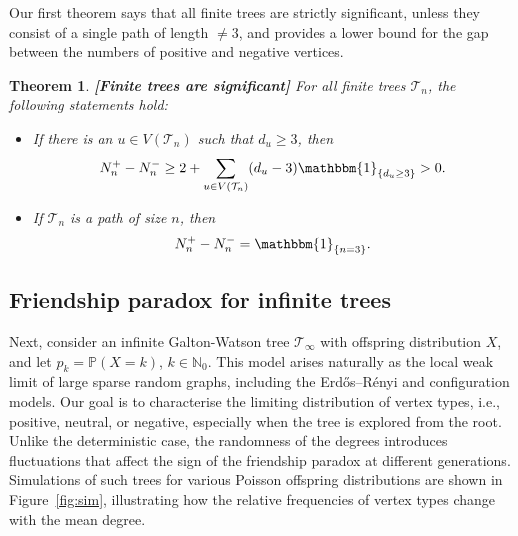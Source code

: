 \documentclass[11pt]{article}
\numberwithin{equation}{section}
\theoremstyle{plain}
\newtheorem{theorem}{Theorem}[section]
\newcommand{\N}{\mathbb N}
\newcommand{\PP}{\mathbb{P}}
\newcommand{\Tt}{\mathcal{T}}
\newcommand{\ind}[1]{\mathbbm{1}_{\left\{#1\right\}}}
\begin{document}
Our first theorem says that all finite trees are strictly significant, unless they consist of a single path of length $\neq 3$, and provides a lower bound for the gap between the numbers of positive and negative vertices.

\begin{theorem}{\bf [Finite trees are significant]}
\label{thm:finite-trees-significant}
For all finite trees $\mathcal{T}_n$,  the following statements hold:
\begin{itemize}
\item[(a)] 
If there is an $u\in V(\Tt_n)$ such that $d_u\ge 3$, then
\begin{equation}
\label{eq:difference-finite-tree}
N_n^+ - N_n^- \geq 2 + \sum_{u \in V(\Tt_n)} (d_u-3) \ind{d_u \geq 3} > 0.
\end{equation}
\item[(b)] 
If $\Tt_n$ is a path of size $n$, then
\[
N_n^+-N_n^-=\ind{n=3}.
\]
\end{itemize}
\end{theorem}


\subsection{Friendship paradox for infinite trees}
\label{sec:FP-infinite-tree}

Next, consider an infinite Galton-Watson tree $\mathcal{T}_\infty$ with offspring distribution $X$, and let $p_k=\PP(X=k)$, $k\in\N_0$. This model arises naturally as the local weak limit of large sparse random graphs, including the Erd\H{o}s–R\'enyi and configuration models. Our goal is to characterise the limiting distribution of vertex types, i.e., positive, neutral, or negative, especially when the tree is explored from the root. Unlike the deterministic case, the randomness of the degrees introduces fluctuations that affect the sign of the friendship paradox at different generations. Simulations of such trees for various Poisson offspring distributions are shown in Figure~\ref{fig:sim}, illustrating how the relative frequencies of vertex types change with the mean degree.
\end{document}
